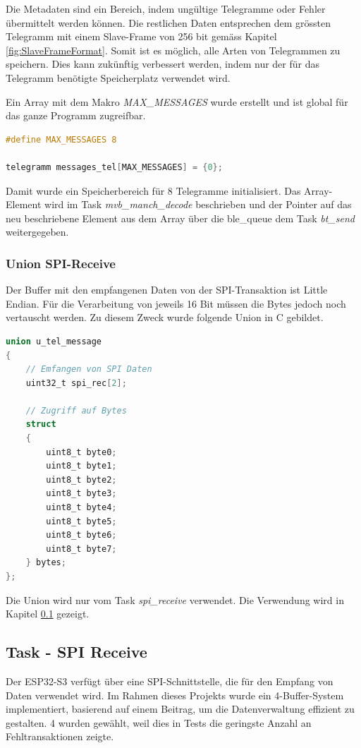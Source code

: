 Die Metadaten sind ein Bereich, indem ungültige Telegramme oder Fehler übermittelt werden können. Die restlichen Daten entsprechen dem grössten Telegramm mit einem Slave-Frame von 256 bit gemäss Kapitel \ref{fig:SlaveFrameFormat}. Somit ist es möglich, alle Arten von Telegrammen zu speichern. Dies kann zukünftig verbessert werden, indem nur der für das Telegramm benötigte Speicherplatz verwendet wird. 

Ein Array mit dem Makro \textit{MAX\_MESSAGES} wurde erstellt und ist global für das ganze Programm zugreifbar. 

\begin{lstlisting}[language=C]
#define MAX_MESSAGES 8

telegramm messages_tel[MAX_MESSAGES] = {0};
\end{lstlisting}

Damit wurde ein Speicherbereich für 8 Telegramme initialisiert. Das Array-Element wird im Task \textit{mvb\_manch\_decode} beschrieben und der Pointer auf das neu beschriebene Element aus dem Array über die ble\_queue dem Task \textit{bt\_send} weitergegeben. 


\subsubsection{Union SPI-Receive}
\label{subsub:UnionSPI}

Der Buffer mit den empfangenen Daten von der SPI-Transaktion ist Little Endian. Für die Verarbeitung von jeweils 16 Bit müssen die Bytes jedoch noch vertauscht werden. Zu diesem Zweck wurde folgende Union in C gebildet.

\begin{lstlisting}[language=C]
union u_tel_message
{
    // Emfangen von SPI Daten
    uint32_t spi_rec[2];

    // Zugriff auf Bytes
    struct 
    {
        uint8_t byte0;
        uint8_t byte1;
        uint8_t byte2;
        uint8_t byte3;
        uint8_t byte4;
        uint8_t byte5;
        uint8_t byte6;
        uint8_t byte7;
    } bytes;
};
\end{lstlisting}

Die Union wird nur vom Task \textit{spi\_receive} verwendet. Die Verwendung wird in Kapitel \ref{sub:TaskSPIReceive} gezeigt. 


\subsection{Task - SPI Receive}
\label{sub:TaskSPIReceive}
Der ESP32-S3 verfügt über eine SPI-Schnittstelle, die für den Empfang von Daten verwendet wird. Im Rahmen dieses Projekts wurde ein 4-Buffer-System implementiert, basierend auf einem Beitrag\cite{ESP_FORUM_SPI_BUFFER}, um die Datenverwaltung effizient zu gestalten. 4 wurden gewählt, weil dies in Tests die geringste Anzahl an Fehltransaktionen zeigte.


